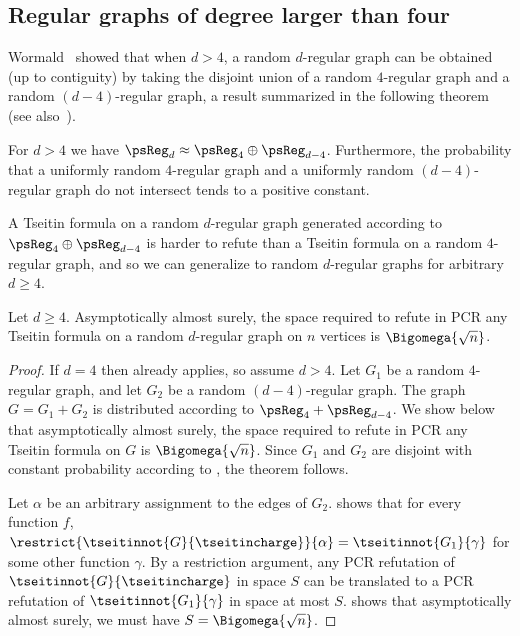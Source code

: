 \documentclass{toc}
\begin{document}
%

\subsection{Regular graphs of degree larger than four}
Wormald~\cite[Corollary 4.17]{W} showed that when $d > 4$, a random $d$-regular graph can be obtained (up to contiguity) by taking the disjoint union of a random $4$-regular graph and a random $(d-4)$-regular graph, a result summarized in the following theorem (see also~\cite[Corollary 9.44]{JLR}).

\begin{theorem}\label{th:regular}
 For $d > 4$ we have $\psReg_d \approx \psReg_4 \oplus \psReg_{d-4}$. Furthermore, the probability that a uniformly random $4$-regular graph and a uniformly random $(d-4)$-regular graph do not intersect tends to a positive constant.
\end{theorem}

A Tseitin formula on a random $d$-regular graph generated according to $\psReg_4 \oplus \psReg_{d-4}$ is harder to refute than a Tseitin formula on a random $4$-regular graph, and so we can generalize  to random $d$-regular graphs for arbitrary $d \geq 4$.

\begin{theorem}
 Let $d \geq 4$. Asymptotically almost surely, the space required to refute in PCR any Tseitin formula on a random $d$-regular graph on $n$ vertices is $\Bigomega{\sqrt{n}}$.
\end{theorem}
\begin{proof}
 If $d = 4$ then  already applies, so assume $d > 4$.
 Let $G_1$ be a random $4$-regular graph, and let $G_2$ be a random $(d-4)$-regular graph. The graph $G = G_1 + G_2$ is distributed according to $\psReg_4 + \psReg_{d-4}$. We show below that asymptotically almost surely, the space required to refute in PCR any Tseitin formula on $G$ is $\Bigomega{\sqrt{n}}$. Since $G_1$ and $G_2$ are disjoint with constant probability according to , the theorem follows.

 Let $\alpha$ be an arbitrary assignment to the edges of $G_2$.  shows that for every function $f$, $\restrict{\tseitinnot{G}{\tseitincharge}}{\alpha} = \tseitinnot{G_1}{\gamma}$ for some other function $\gamma$. By a restriction argument, any PCR refutation of $\tseitinnot{G}{\tseitincharge}$ in space $S$ can be translated to a PCR refutation of $\tseitinnot{G_1}{\gamma}$ in space at most $S$.  shows that asymptotically almost surely, we must have $S  = \Bigomega{\sqrt{n}}$.
\end{proof}
\end{document}
